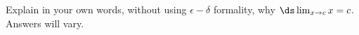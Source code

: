{Explain in your own words, without using $\epsilon-\delta$ formality, why $\ds \lim_{x\to c} x = c$.}
{Answers will vary.
}
